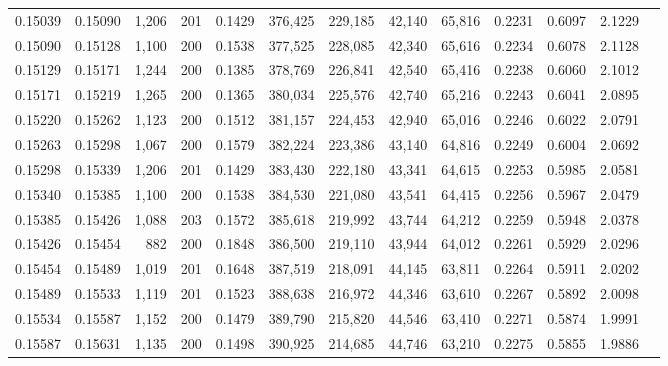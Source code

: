 \begin{tabular}{rrrrrrrrrrrrr}
0.15039 & 0.15090 & 1,206 & 201 &                                     0.1429 & 376,425 & 229,185 &  42,140 &  65,816 & 0.2231 & 0.6097 & 2.1229 \\
0.15090 & 0.15128 & 1,100 & 200 &                                     0.1538 & 377,525 & 228,085 &  42,340 &  65,616 & 0.2234 & 0.6078 & 2.1128 \\
0.15129 & 0.15171 & 1,244 & 200 &                                     0.1385 & 378,769 & 226,841 &  42,540 &  65,416 & 0.2238 & 0.6060 & 2.1012 \\
0.15171 & 0.15219 & 1,265 & 200 &                                     0.1365 & 380,034 & 225,576 &  42,740 &  65,216 & 0.2243 & 0.6041 & 2.0895 \\
0.15220 & 0.15262 & 1,123 & 200 &                                     0.1512 & 381,157 & 224,453 &  42,940 &  65,016 & 0.2246 & 0.6022 & 2.0791 \\
0.15263 & 0.15298 & 1,067 & 200 &                                     0.1579 & 382,224 & 223,386 &  43,140 &  64,816 & 0.2249 & 0.6004 & 2.0692 \\
0.15298 & 0.15339 & 1,206 & 201 &                                     0.1429 & 383,430 & 222,180 &  43,341 &  64,615 & 0.2253 & 0.5985 & 2.0581 \\
0.15340 & 0.15385 & 1,100 & 200 &                                     0.1538 & 384,530 & 221,080 &  43,541 &  64,415 & 0.2256 & 0.5967 & 2.0479 \\
0.15385 & 0.15426 & 1,088 & 203 &                                     0.1572 & 385,618 & 219,992 &  43,744 &  64,212 & 0.2259 & 0.5948 & 2.0378 \\
0.15426 & 0.15454 &   882 & 200 &                                     0.1848 & 386,500 & 219,110 &  43,944 &  64,012 & 0.2261 & 0.5929 & 2.0296 \\
0.15454 & 0.15489 & 1,019 & 201 &                                     0.1648 & 387,519 & 218,091 &  44,145 &  63,811 & 0.2264 & 0.5911 & 2.0202 \\
0.15489 & 0.15533 & 1,119 & 201 &                                     0.1523 & 388,638 & 216,972 &  44,346 &  63,610 & 0.2267 & 0.5892 & 2.0098 \\
0.15534 & 0.15587 & 1,152 & 200 &                                     0.1479 & 389,790 & 215,820 &  44,546 &  63,410 & 0.2271 & 0.5874 & 1.9991 \\
0.15587 & 0.15631 & 1,135 & 200 &                                     0.1498 & 390,925 & 214,685 &  44,746 &  63,210 & 0.2275 & 0.5855 & 1.9886 \\

\end{tabular}
